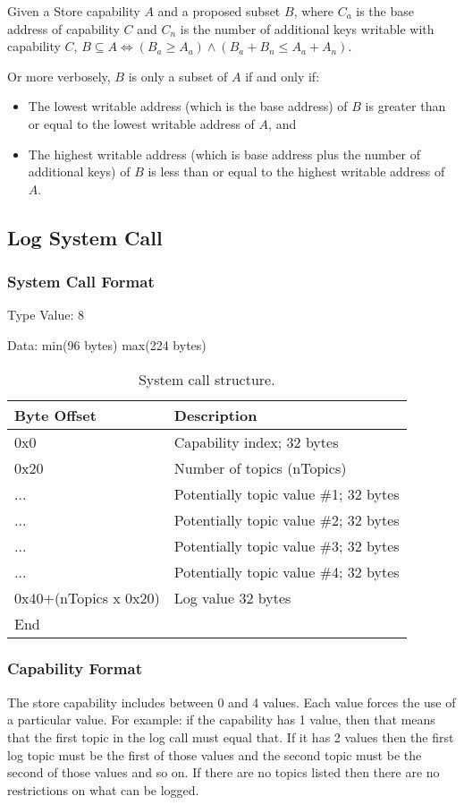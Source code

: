 \documentclass[english,a4paper]{article}
\let\oldparagraph\subsubsection
\renewcommand{\subsubsection}[1]{\oldparagraph{#1}\mbox{}}
\begin{document}
Given a Store capability $A$ and a proposed subset $B$, where $C_a$ is the base
address of capability $C$ and $C_n$ is the number of additional keys writable
with capability $C$, $B \subseteq A \iff \left(B_a \geq A_a\right) \land
\left(B_a + B_n \leq A_a + A_n\right)$.

Or more verbosely, $B$ is only a subset of $A$ if and only if:
\begin{itemize}
  \item The lowest writable address (which is the base address) of $B$ is
  greater than or equal to the lowest writable address of $A$, and
  \item The highest writable address (which is base address plus the number of
  additional keys) of $B$ is less than or equal to the highest writable address
  of $A$.
\end{itemize}

\subsection{Log System Call}

\subsubsection{System Call Format}
Type Value: 8

Data: min(96 bytes) max(224 bytes)

\begin{table}[H]
  \caption{System call structure.}
  \centering{}%
  \begin{tabular}{l|p{}}
    \hline
    Byte Offset & Description\tabularnewline
    \hline
    \hline
    0x0 & Capability index; 32 bytes \tabularnewline
    0x20 & Number of topics (nTopics) \tabularnewline
    ... & Potentially topic value \#1; 32 bytes \tabularnewline
    ... & Potentially topic value \#2; 32 bytes \tabularnewline
    ... & Potentially topic value \#3; 32 bytes \tabularnewline
    ... & Potentially topic value \#4; 32 bytes \tabularnewline
    0x40+(nTopics x 0x20) & Log value 32 bytes \tabularnewline
    \hline
    End &  \tabularnewline
    \hline
  \end{tabular}
\end{table}

\subsubsection{Capability Format}
The store capability includes between 0 and 4 values. Each value forces the use
of a particular value. For example: if the capability has 1 value, then that
means that the first topic in the log call must equal that. If it has 2 values
then the first log topic must be the first of those values and the second topic
must be the second of those values and so on. If there are no topics listed then
there are no restrictions on what can be logged.
\end{document}
